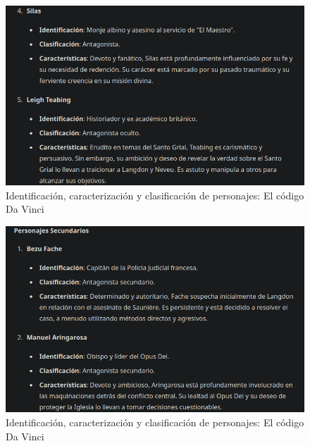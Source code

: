 \documentclass[journal,onecolumn]{IEEEtran}
\begin{document}
	\begin{figure}[H]
		\centering
		\includegraphics[scale=0.5]{gpt4_3}
		\caption{Identificación, caracterización y clasificación de personajes: El código Da Vinci}
		\small
	\end{figure}
	\begin{figure}[H]
		\centering
		\includegraphics[scale=0.5]{gpt4_4}
		\caption{Identificación, caracterización y clasificación de personajes: El código Da Vinci}
		\small
	\end{figure}
\end{document}
